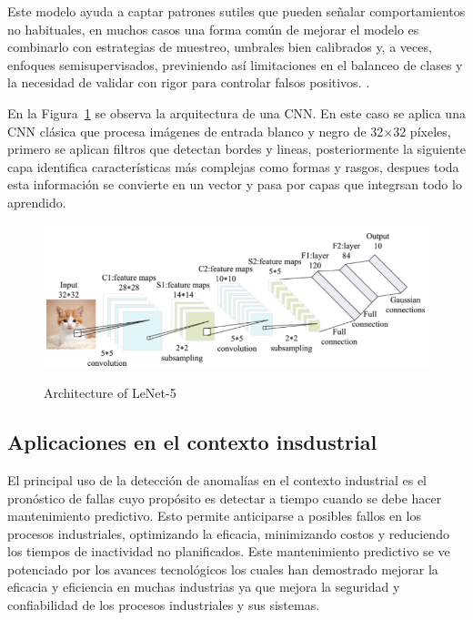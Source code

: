 \documentclass[11pt,a4paper,spanish]{book}
\numberwithin{equation}{chapter}
\numberwithin{figure}{chapter}
\begin{document}
Este modelo ayuda a captar patrones sutiles que pueden señalar comportamientos no 
habituales, en muchos casos una forma común de mejorar el modelo es combinarlo con 
estrategias de muestreo, umbrales bien calibrados y, a veces, enfoques semisupervisados, 
previniendo así limitaciones en el balanceo de clases y la necesidad de validar con 
rigor para controlar falsos positivos. \cite{ameijeiras2021algoritmos}.


En la Figura~\ref{fig:figLenet} se observa la arquitectura de una CNN. En este caso se 
aplica una CNN clásica que procesa imágenes de entrada blanco y negro de 32×32 píxeles, 
primero se aplican filtros que detectan bordes y lineas, posteriormente la siguiente 
capa identifica características más complejas como formas y rasgos, despues toda esta 
información se convierte en un vector y pasa por capas que integrsan todo lo aprendido. 
\cite{Zhao2024review}


\begin{figure}[H]
    \caption{Architecture of LeNet-5  \protect\cite{Zhao2024review}}
    \centering
    \includegraphics[width=1.0\textwidth]{media/lenet-o5.png}
    \label{fig:figLenet}
\end{figure}


\subsection{Aplicaciones en el contexto insdustrial} 

El principal uso de la detección de anomalías en el contexto industrial es el pronóstico 
de fallas cuyo propósito es detectar a tiempo cuando se debe hacer mantenimiento 
predictivo. Esto permite anticiparse a posibles fallos en los procesos industriales, 
optimizando la eficacia, minimizando costos y reduciendo los tiempos de inactividad no 
planificados. Este mantenimiento predictivo se ve potenciado por los avances tecnológicos 
los cuales han demostrado mejorar la eficacia y eficiencia en muchas industrias ya que 
mejora la seguridad y confiabilidad de los procesos industriales y sus sistemas.
\end{document}
